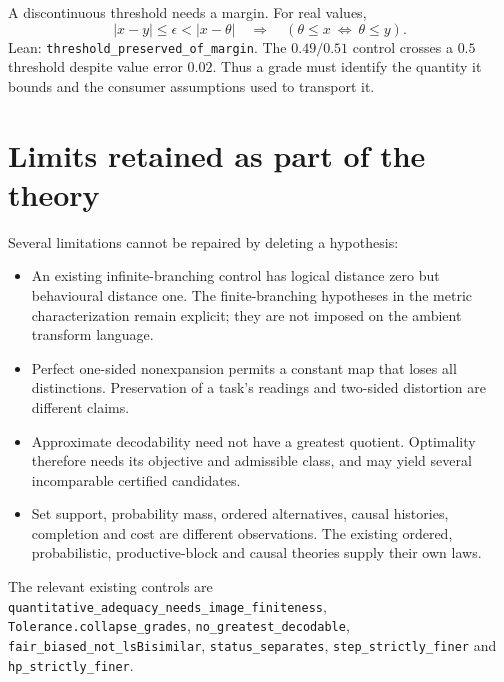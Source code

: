 \documentclass[11pt]{article}
\newcommand{\lean}[1]{\nolinkurl{#1}}
\begin{document}
A discontinuous threshold needs a margin. For real values,
\[
 |x-y|\le\epsilon<|x-\theta|
 \quad\Longrightarrow\quad
 (\theta\le x\ \Longleftrightarrow\ \theta\le y).
\]
Lean: \lean{threshold_preserved_of_margin}. The $0.49/0.51$ control crosses a
$0.5$ threshold despite value error $0.02$. Thus a grade must identify the
quantity it bounds and the consumer assumptions used to transport it.

\section{Limits retained as part of the theory}
Several limitations cannot be repaired by deleting a hypothesis:
\begin{itemize}
\item An existing infinite-branching control has logical distance zero but
behavioural distance one. The finite-branching hypotheses in the metric
characterization remain explicit; they are not imposed on the ambient
transform language.
\item Perfect one-sided nonexpansion permits a constant map that loses all
distinctions. Preservation of a task's readings and two-sided distortion are
different claims.
\item Approximate decodability need not have a greatest quotient. Optimality
therefore needs its objective and admissible class, and may yield several
incomparable certified candidates.
\item Set support, probability mass, ordered alternatives, causal histories,
completion and cost are different observations. The existing ordered,
probabilistic, productive-block and causal theories supply their own laws.
\end{itemize}
The relevant existing controls are
\lean{quantitative_adequacy_needs_image_finiteness},
\lean{Tolerance.collapse_grades}, \lean{no_greatest_decodable},
\lean{fair_biased_not_lsBisimilar}, \lean{status_separates},
\lean{step_strictly_finer} and \lean{hp_strictly_finer}.
\end{document}
